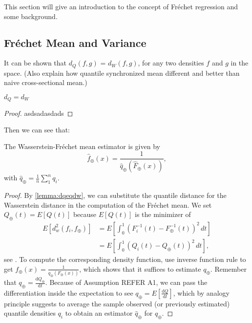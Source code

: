 This section will give an introduction to the concept of Fréchet regression
and some background.

\subsection{Fréchet Mean and Variance}
\label{sec:fr mean and variance}



It can be shown that $d_Q(f,g)$ = $d_W(f,g)$, for any two densities $f$ and $g$ in the
space. (Also explain how quantile synchronized mean different and better than naive
cross-sectional mean.)
\begin{lemma}
    \label{lemma:dqeqdw}
    $d_Q = d_W$
\end{lemma}
\begin{proof}
    asdsadasdads
\end{proof}

Then we can see that:
\begin{lemma}
    The Wasserstein-Fréchet mean estimator is given by
    \begin{equation}
        \hat{f}_\oplus(x) = \frac{1}{\hat{q}_\oplus(\hat{F}_\oplus(x))},
    \end{equation}
    with $\hat{q}_\oplus = \frac{1}{n} \sum_{1}^{n} q_i$.
\end{lemma}
\begin{proof}
    By \ref{lemma:dqeqdw}, we can substitute the quantile distance for the
    Wasserstein distance in the computation of the Fréchet mean. We set
    $Q_\oplus(t) = E[Q(t)]$ because $E[Q(t)]$ is the minimizer of
    \begin{equation}
    \label{eq:wf_mean}
        \begin{aligned}
            E[d_w^2(f_i, f_\oplus)]	& =
            E\left[\int_{0}^{1}(F_i^{-1}(t) - F_\oplus^{-1}(t))^2 \,dt\right] \\
                                    & =
            E\left[\int_{0}^{1}(Q_i(t) - Q_\oplus(t))^2 \,dt\right],
        \end{aligned}
    \end{equation}
    see \citet[Chapter~3.1.4]{PanaretosZemel2020}. To compute the corresponding density
    function, use inverse function rule to get
    $f_\oplus(x) = \frac{1}{q_\oplus(F_\oplus(x))}$, which shows that it suffices to
    estimate $q_\oplus$. Remember that
    $q_\oplus = \frac{\mathrm{d}Q_\oplus}{\mathrm{d}t}$. Because of Assumption REFER A1,
    we can pass the differentiation inside the expectation to see
    $q_\oplus = E\left[\frac{\mathrm{d}Q}{\mathrm{d}t}\right]$, which by analogy
    principle suggests to average the sample observed (or previously estimated)
    quantile densities $q_i$ to obtain an estimator $\hat{q}_\oplus$ for $q_\oplus$.
\end{proof}
